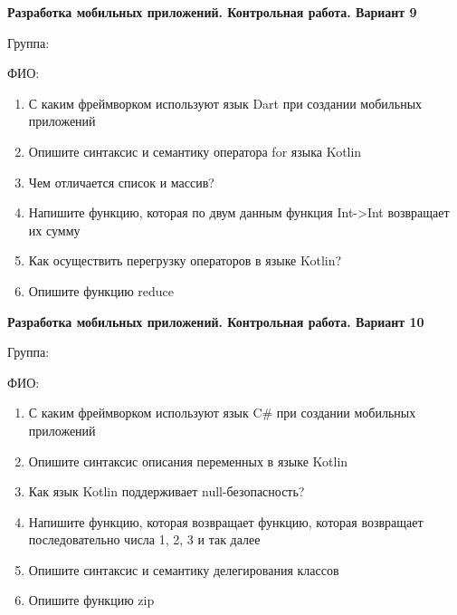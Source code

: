 \documentclass[12pt]{article}
\begin{document}
\newpage\begin{minipage}{\textwidth}
\textbf{Разработка мобильных приложений. Контрольная работа. Вариант 9}

Группа: \underline{\hspace{3cm}}

ФИО: \underline{\hspace{10cm}}

\begin{enumerate}
\item С каким фреймворком используют язык Dart при создании мобильных приложений
\item Опишите синтаксис и семантику оператора for языка Kotlin
\item Чем отличается список и массив?
\item Напишите функцию, которая по двум данным функция Int->Int возвращает их сумму
\item Как осуществить перегрузку операторов в языке Kotlin?
\item Опишите функцию reduce

\end{enumerate}
\end{minipage}

\newpage\begin{minipage}{\textwidth}
\textbf{Разработка мобильных приложений. Контрольная работа. Вариант 10}

Группа: \underline{\hspace{3cm}}

ФИО: \underline{\hspace{10cm}}

\begin{enumerate}
\item С каким фреймворком используют язык C\# при создании мобильных приложений
\item Опишите синтаксис описания переменных в языке Kotlin
\item Как язык Kotlin поддерживает null-безопасность?
\item Напишите функцию, которая возвращает функцию, которая возвращает последовательно числа 1, 2, 3 и так далее
\item Опишите синтаксис и семантику делегирования классов
\item Опишите функцию zip

\end{enumerate}
\end{minipage}
\end{document}
